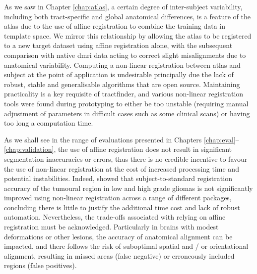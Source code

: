 As we saw in Chapter \ref{chap:atlas}, a certain degree of inter-subject variability, including both tract-specific and global anatomical differences, is a feature of the atlas due to the use of affine registration to combine the training data in template space.
We mirror this relationship by allowing the atlas to be registered to a new target dataset using affine registration alone, with the subsequent comparison with native \gls{dmri} data acting to correct slight misalignments due to anatomical variability.
Computing a non-linear registration between atlas and subject at the point of application is undesirable principally due the lack of robust, stable and generalisable algorithms that are open source.
Maintaining practicality is a key requisite of tractfinder, and various non-linear registration tools were found during prototyping to either be too unstable (requiring manual adjustment of parameters in difficult cases such as some clinical scans) or having too long a computation time\autocite{Visser2020}.

As we shall see in the range of evaluations presented in Chapters \ref{chap:eval}--\ref{chap:validation}, the use of affine registration does not result in significant segmentation inaccuracies or errors, thus there is no credible incentive to favour the use of non-linear registration at the cost of increased processing time and potential instabilities.
Indeed, \textcite{Visser2020} showed that subject-to-standard registration accuracy of the tumoural region in low and high grade gliomas is not significantly improved using non-linear registration across a range of different packages, concluding there is little to justify the additional time cost and lack of robust automation.
Nevertheless, the trade-offs associated with relying on affine registration must be acknowledged.
Particularly in brains with modest deformations or other lesions, the accuracy of anatomical alignment can be impacted, and there follows the risk of suboptimal spatial and / or orientational alignment, resulting in missed areas (false negative) or erroneously included regions (false positives).

